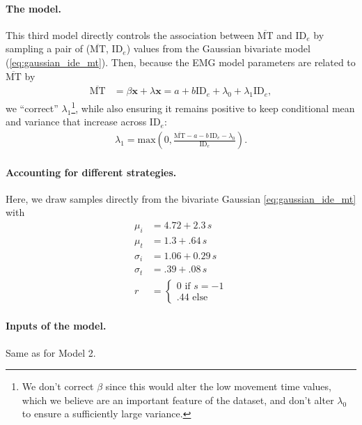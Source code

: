 \documentclass[acmlarge, manuscript,review]{acmart}
\newcommand{\mmt}{\ensuremath{\overline{\mt}}\xspace}
\newcommand{\mt}{\ensuremath{{\text{MT}}}\xspace}
\newcommand{\ide}{\ensuremath{{\text{ID}_e}}\xspace}
\begin{document}
\paragraph{The model.} This third model directly controls the association between \mmt and \ide by sampling a pair of (\mmt, \ide) values from the Gaussian bivariate model (\autoref{eq:gaussian_ide_mt}).
Then, because the EMG model parameters are related to \mmt by
\begin{align}
	\mmt & = \beta \mathbf{x} + \lambda \mathbf{x} = a + b \ide + \lambda_0 + \lambda_1 \ide,
\end{align}
we ``correct'' $\lambda_1$\footnote{We don't correct $\beta$ since this would alter the low movement time values, which we believe are an important feature of the dataset, and don't alter $\lambda_0$ to ensure a sufficiently large variance.}, while also ensuring it remains positive to keep conditional mean and variance that increase across \ide:
\begin{align}
	\lambda_1 = \text{max}(0, \frac{\mmt - a - b\,\ide - \lambda_0}{\ide}). \label{eq:lambda_1}
\end{align}

\paragraph{Accounting for different strategies.} Here, we draw samples directly from the bivariate Gaussian \autoref{eq:gaussian_ide_mt} with
\begin{align}
	\mu_i    & = 4.72 + 2.3\,s        \\
	\mu_t    & = 1.3 + .64\,s         \\
	\sigma_i & = 1.06 + 0.29\,s       \\
	\sigma_t & = .39 + .08\,s         \\
	r        & = \begin{cases}
		             0 \text{ if } s = -1 \\
		             .44 \text{ else}
	             \end{cases}
\end{align}

\paragraph{Inputs of the model.} Same as for Model 2.
\end{document}
